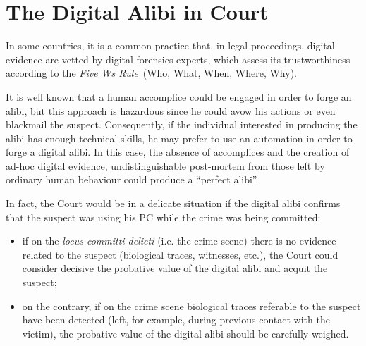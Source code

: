 \documentclass[runningheads]{llncs}
\begin{document}
%
%
%
%
%
%
%

\section{The Digital Alibi in Court}


In some countries, it is a common practice that, in legal proceedings, digital evidence are vetted by digital forensics experts, which assess its trustworthiness according to the \emph{Five Ws Rule}~(Who, What, When, Where, Why).

It is well known that a human accomplice could be engaged in order to forge an alibi, but this approach is hazardous since he could avow his actions or even blackmail the suspect. Consequently, if the individual interested in producing the alibi has enough technical skills, he may prefer to use an automation in order to forge a digital alibi. In this case, the absence of accomplices and the creation of ad-hoc digital evidence, undistinguishable post-mortem from those left by  ordinary human behaviour could produce a ``perfect alibi''. 

In fact, the Court would be in a delicate situation if the digital alibi confirms that the suspect was using his PC while the crime was being committed:
\begin{itemize}
\item if on the \emph{locus committi delicti} (i.e. the crime scene) there is no evidence related to the suspect (biological traces, witnesses, etc.), the Court could consider decisive the probative value of the digital alibi and acquit the suspect;
\item on the contrary, if on the crime scene biological traces referable to the suspect have been detected (left, for example, during previous contact with the victim), the probative value of the digital alibi should be carefully weighed.
\end{itemize}
\end{document}

